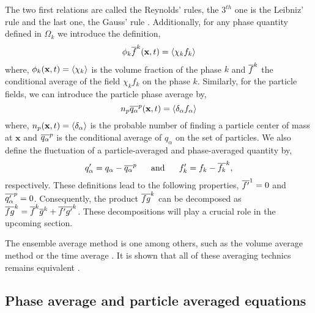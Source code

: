 The two first relations are called the Reynolds' rules, the $3^{th}$ one is the Leibniz' 
rule and the last one, the Gauss' rule \citep{drew1983mathematical}.
Additionally, for any phase quantity defined in $\Omega_k$ we introduce the definition, 
\begin{equation}
    \phi_k\overline{f}^k(\textbf{x},t) = \left<\chi_k f_k\right>
    \label{eq:1_avg}
\end{equation}
where, $\phi_k(\textbf{x},t) = \left<\chi_k\right>$ is the volume fraction of the phase $k$
and $\overline{f}^k$ the conditional average of the field $\chi_k f_k$ on the phase $k$.
Similarly, for the particle fields, we can introduce the particle phase average by,
\begin{equation}
     n_p\overline{q_\alpha}^{p}(\textbf{x},t) = \left<\delta_\alpha f_\alpha\right>
     \label{eq:p_avg}
\end{equation}
where, $n_p(\textbf{x},t) = \left<\delta_\alpha\right>$ is the probable number of finding a particle center of mass at $\textbf{x}$
and $\overline{q_\alpha}^{p}$ is the conditional average of $q_\alpha$ on the set of particles. 
We also define the fluctuation of a particle-averaged and phase-averaged quantity by,
\begin{equation}
    q_\alpha' = q_\alpha - \overline{q_\alpha}^{p}
    \;\;\;\;\;\;\text{and}
    \;\;\;\;\;\;
    f_k' = f_k - \overline{f_k}^k,
    \label{eq:def_fluctu}
\end{equation}
respectively. 
These definitions lead to the following properties, $\overline{f'}^1 = 0$ and $\overline{q_\alpha'}^{p} =0$. 
Consequently, the product $\overline{fg}^k$ can be decomposed as $\overline{fg}^k=\overline{f}^k\overline{g}^k + \overline{f'g'}^k$. 
These decompositions will play a crucial role in the upcoming section. 

The ensemble average method is one among others, such as the volume average method\citep{jackson1997locally} or the time average
\citep{ishii2010thermo}.
It is shown that all of these averaging technics remains equivalent \citep{jackson1997locally}. 

\subsection{Phase average and particle averaged equations}

